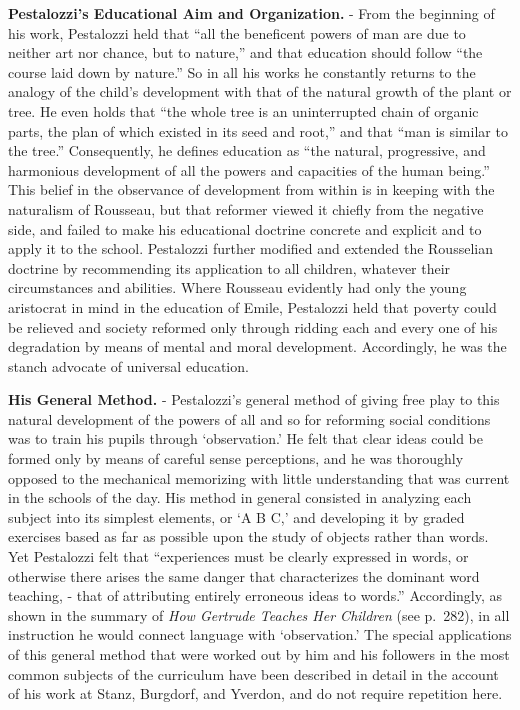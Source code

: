 \documentclass[
]{book}
\begin{document}
\textbf{Pestalozzi's Educational Aim and Organization.} - From the beginning of his work, Pestalozzi held that ``all the beneficent powers of man are due to neither art nor chance, but to nature,'' and that education should follow ``the course laid down by nature.'' So in all his works he constantly returns to the analogy of the child's development with that of the natural growth of the plant or tree. He even holds that ``the whole tree is an uninterrupted chain of organic parts, the plan of which existed in its seed and root,'' and that ``man is similar to the tree.'' Consequently, he defines education as ``the natural, progressive, and harmonious development of all the powers and capacities of the human being.'' This belief in the observance of development from within is in keeping with the naturalism of Rousseau, but that reformer viewed it chiefly from the negative side, and failed to make his educational doctrine concrete and explicit and to apply it to the school. Pestalozzi further modified and extended the Rousselian doctrine by recommending its application to all children, whatever their circumstances and abilities. Where Rousseau evidently had only the young aristocrat in mind in the education of Emile, Pestalozzi held that poverty could be relieved and society reformed only through ridding each and every one of his degradation by means of mental and moral development. Accordingly, he was the stanch advocate of universal education.

\textbf{His General Method.} - Pestalozzi's general method of giving free play to this natural development of the powers of all and so for reforming social conditions was to train his pupils through `observation.' He felt that clear ideas could be formed only by means of careful sense perceptions, and he was thoroughly opposed to the mechanical memorizing with little understanding that was current in the schools of the day. His method in general consisted in analyzing each subject into its simplest elements, or `A B C,' and developing it by graded exercises based as far as possible upon the study of objects rather than words. Yet Pestalozzi felt that ``experiences must be clearly expressed in words, or otherwise there arises the same danger that characterizes the dominant word teaching, - that of attributing entirely erroneous ideas to words.'' Accordingly, as shown in the summary of \emph{How Gertrude Teaches Her Children} (see p.~282), in all instruction he would connect language with `observation.' The special applications of this general method that were worked out by him and his followers in the most common subjects of the curriculum have been described in detail in the account of his work at Stanz, Burgdorf, and Yverdon, and do not require repetition here.
\end{document}
